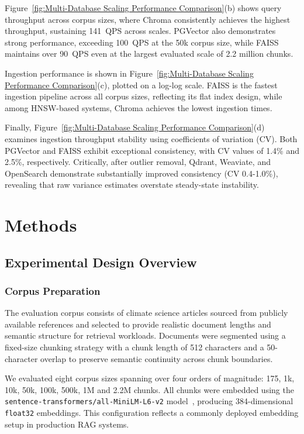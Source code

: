 \documentclass{article}
\begin{document}
Figure~\ref{fig:Multi-Database Scaling Performance Comparison}(b) shows query throughput across corpus sizes, where Chroma consistently achieves the highest throughput, sustaining 141~QPS across scales. PGVector also demonstrates strong performance, exceeding 100~QPS at the 50k corpus size, while FAISS maintains over 90~QPS even at the largest evaluated scale of 2.2 million chunks. 

Ingestion performance is shown in Figure~\ref{fig:Multi-Database Scaling Performance Comparison}(c), plotted on a log-log scale. FAISS is the fastest ingestion pipeline across all corpus sizes, reflecting its flat index design, while among HNSW-based systems, Chroma achieves the lowest ingestion times. 

Finally, Figure~\ref{fig:Multi-Database Scaling Performance Comparison}(d) examines ingestion throughput stability using coefficients of variation (CV). Both PGVector and FAISS exhibit exceptional consistency, with CV values of 1.4\% and 2.5\%, respectively. Critically, after outlier removal, Qdrant, Weaviate, and OpenSearch demonstrate substantially improved consistency (CV 0.4-1.0\%), revealing that raw variance estimates overstate steady-state instability.

\section{Methods}
\label{sec: methods}
\subsection{Experimental Design Overview}
\subsubsection{Corpus Preparation}
The evaluation corpus consists of climate science articles sourced from publicly available references and selected to provide realistic document lengths and semantic structure for retrieval workloads. Documents were segmented using a fixed-size chunking strategy with a chunk length of 512 characters and a 50-character overlap to preserve semantic continuity across chunk boundaries.

We evaluated eight corpus sizes spanning over four orders of magnitude: 175, 1k, 10k, 50k, 100k, 500k, 1M and 2.2M chunks. All chunks were embedded using the \texttt{sentence-transformers/all-MiniLM-L6-v2} model~\cite{reimers2019sentencebert}, producing 384-dimensional \texttt{float32} embeddings.
This configuration reflects a commonly deployed embedding setup in production RAG systems.
\end{document}
